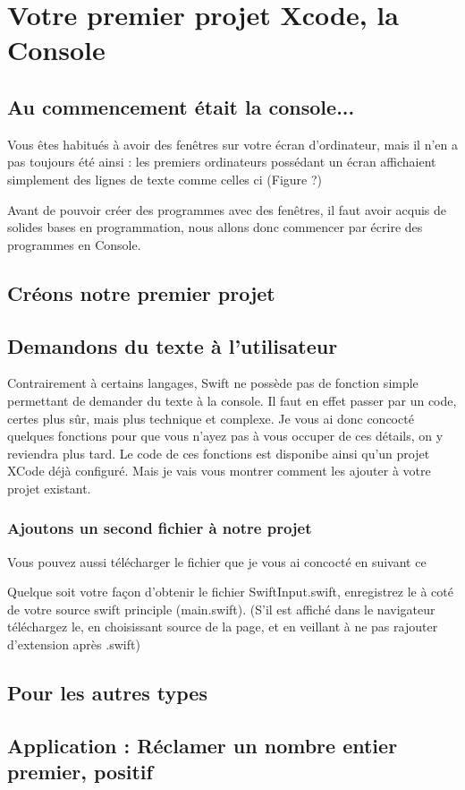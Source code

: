 \chapter{Votre premier projet Xcode, la Console}

\section{Au commencement était la console...}
Vous êtes habitués à avoir des fenêtres sur votre écran d'ordinateur, mais il n'en a pas toujours été ainsi : les premiers ordinateurs possédant un écran affichaient simplement des lignes de texte comme celles ci (Figure ?)

Avant de pouvoir créer des programmes avec des fenêtres, il faut avoir acquis de solides bases en programmation, nous allons donc commencer par écrire des programmes en Console.
\section{Créons notre premier projet}
\section{Demandons du texte à l'utilisateur}
Contrairement à certains langages, Swift ne possède pas de fonction simple permettant de demander du texte à la console.
Il faut en effet passer par un code, certes plus sûr, mais plus technique et complexe.
Je vous ai donc concocté quelques fonctions
pour que vous n'ayez pas à vous occuper de ces détails,
on y reviendra plus tard. %
Le code de ces fonctions est disponibe  ainsi qu'un projet XCode déjà configuré.
Mais je vais vous montrer comment les ajouter à votre projet existant.
\subsection{Ajoutons un second fichier à notre projet}
Vous pouvez aussi télécharger le fichier que je vous ai concocté en suivant ce  


Quelque soit votre façon d'obtenir le fichier SwiftInput.swift, enregistrez le à coté de votre source swift principle (main.swift). (S'il est affiché dans le navigateur téléchargez le, en choisissant source de la page, et en veillant à ne pas rajouter d'extension après .swift)
\section{Pour les autres types}
\section{Application : Réclamer un nombre entier premier, positif}
